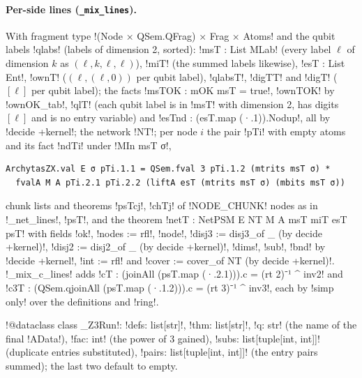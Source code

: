 {{{\paragraph{Per-side lines (\texttt{\_mix\_lines}).} With fragment type
\lexlean!(Node × QSem.QFrag) × Frag × Atoms! and the qubit labels \lexcode!qlabs! (labels of
dimension 2, sorted): \lexlean!msT : List MLab! (every label $\ell$ of dimension $k$ as
$(\ell, k, \ell, \ell)$), \lexlean!miT! (the summed labels likewise), \lexlean!esT : List Ent!,
\lexlean!ownT! ($(\ell, (\ell, 0))$ per qubit label), \lexlean!qlabsT!, \lexlean!digTT! and \lexlean!digT!
($[\ell]$ per qubit label); the facts \lexlean!msTOK : mOK msT = true!, \lexlean!ownTOK! by
\lexlean!ownOK_tab!, \lexlean!qlT! (each qubit label is in \lexlean!msT! with dimension 2, has digits
$[\ell]$ and is no entry variable) and \lexlean!esTnd : (esT.map (·.1)).Nodup!, all by
\lexlean!decide +kernel!; the network \lexlean!NT!; per node $i$ the pair \lexlean!pTi! with empty atoms
and its fact \lexlean!ndTi! under \lexlean!MIn msT σ!,
\begin{lstlisting}[style=lexlean]
ArchytasZX.val E σ pTi.1.1 = QSem.fval 3 pTi.1.2 (mtrits msT σ) *
  fvalA M A pTi.2.1 pTi.2.2 (liftA esT (mtrits msT σ) (mbits msT σ))
\end{lstlisting}
chunk lists and theorems \lexlean!psTcj!, \lexlean!chTj! of \lexpy!NODE_CHUNK! nodes as in
\lexpy!_net_lines!, \lexlean!psT!, and the theorem \lexlean!netT : NetPSM E NT M A msT miT esT psT! with
fields \lexlean!ok!, \lexlean!nodes := rfl!, \lexlean!node!, \lexlean!disj3 := disj3_of _ (by decide +kernel)!,
\lexlean!disj2 := disj2_of _ (by decide +kernel)!, \lexlean!dims!, \lexlean!sub!, \lexlean!bnd! by
\lexlean!decide +kernel!, \lexlean!int := rfl! and \lexlean!cover := cover_of NT (by decide +kernel)!.
\lexpy!_mix_c_lines! adds \lexlean!cT : (joinAll (psT.map (·.2.1))).c = (rt 2)⁻¹ ^ inv2! and
\lexlean!c3T : (QSem.qjoinAll (psT.map (·.1.2))).c = (rt 3)⁻¹ ^ inv3!, each by \lexlean!simp only!
over the definitions and \lexlean!ring!.

\begin{signature}
\lexpy!@dataclass class _Z3Run!: \lexpy!defs: list[str]!, \lexpy!thm: list[str]!, \lexpy!q: str! (the name of
the final \lexlean!AData!), \lexpy!fac: int! (the power of 3 gained),
\lexpy!subs: list[tuple[int, int]]! (duplicate entries substituted), \lexpy!pairs: list[tuple[int, int]]!
(the entry pairs summed); the last two default to empty.
\end{signature}

}}}
